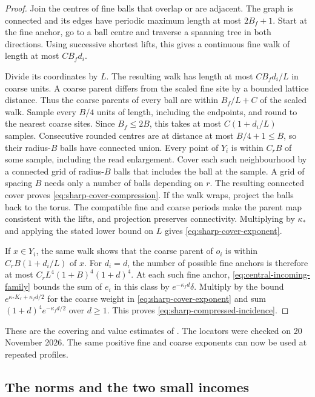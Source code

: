 \documentclass[11pt,reqno]{amsart}
\numberwithin{equation}{section}
\theoremstyle{definition}
\theoremstyle{remark}
\begin{document}
\begin{proof}
Join the centres of fine balls that overlap or are
adjacent. The graph is connected and its edges have
periodic maximum length at most \(2B_f+1\).
Start at the fine anchor, go to a ball centre and
traverse a spanning tree in both directions.
Using successive shortest lifts, this gives a
continuous fine walk of length at most \(CB_fd_i\).

Divide its coordinates by \(L\). The resulting walk
has length at most \(CB_fd_i/L\) in coarse units.
A coarse parent differs from the scaled fine site
by a bounded lattice distance. Thus the coarse
parents of every ball are within \(B_f/L+C\) of
the scaled walk. Sample every \(B/4\) units of length,
including the endpoints, and round to the nearest coarse
sites. Since \(B_f\le2B\), this takes at most
\(C(1+d_i/L)\) samples. Consecutive rounded centres
are at distance at most \(B/4+1\le B\), so their
radius-\(B\) balls have connected union.
Every point of \(Y_i\) is within \(C_r B\) of some
sample, including the read enlargement. Cover each
such neighbourhood by a connected grid of radius-\(B\)
balls that includes the ball at the sample. A grid
of spacing \(B\) needs only a number of balls depending
on \(r\). The resulting connected cover proves
\eqref{eq:sharp-cover-compression}. If the walk wraps,
project the balls back to the torus. The compatible
fine and coarse periods make the parent map consistent
with the lifts, and projection preserves connectivity.
Multiplying by \(\kappa_*\) and applying the stated
lower bound on \(L\) gives \eqref{eq:sharp-cover-exponent}.

If \(x\in Y_i\), the same walk shows that the coarse
parent of \(o_i\) is within \(C_rB(1+d_i/L)\) of \(x\).
For \(d_i=d\), the number of possible fine anchors
is therefore at most \(C_rL^4(1+B)^4(1+d)^4\).
At each such fine anchor, \eqref{eq:central-incoming-family}
bounds the sum of \(e_i\) in this class by
\(e^{-\kappa_f d}\delta\). Multiply by the bound
\(e^{\kappa_*K_r+\kappa_f d/2}\) for the coarse weight
in \eqref{eq:sharp-cover-exponent} and sum
\((1+d)^4e^{-\kappa_f d/2}\) over \(d\ge1\).
This proves \eqref{eq:sharp-compressed-incidence}.
\end{proof}

These are the covering and value estimates of
\cite[Lemma~35.1 and (35.17), pp.~218--219 and 227]{Main}.
The locators were checked on 20 November 2026.
The same positive fine and coarse exponents can now
be used at repeated profiles.

\subsection{The norms and the two small incomes}
\end{document}
